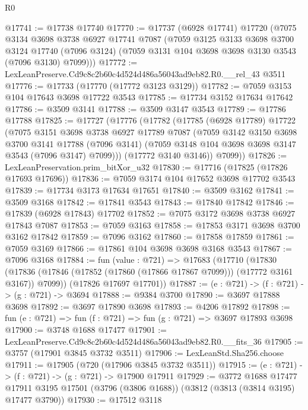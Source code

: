 \begin{lexlean}{R0}
\begin{coremodule}
@17741 := @17738 @17740
@17770 := @17737
    (@6928 @17741)
    @17720
    (@7075
      @3134
      @3698
      @3738
      @6927
      @17741
      @7087
      (@7059
        @3125
        @3133
        @3698
        @3700
        @3124
        @17740
        (@7096 @3124)
        (@7059 @3131 @104 @3698 @3698 @3130 @3543 (@7096 @3130) @7099)))
@17772 := LexLeanPreserve.Cd9c8c2b60c4d524d486a56043ad9eb82.R0.__rel_43 @3511
@17776 := @17733 (@17770 (@17772 @3123 @3129))
@17782 := @7059 @3153 @104 @17643 @3698 @17722 @3543
@17785 := @17734 @3152 @17634 @17642
@17786 := @3509 @3141
@17788 := @3509 @3147 @3543
@17789 := @17786 @17788
@17825 := @17727
    (@17776
      (@17782
        (@17785
          (@6928 @17789)
          @17722
          (@7075
            @3151
            @3698
            @3738
            @6927
            @17789
            @7087
            (@7059
              @3142
              @3150
              @3698
              @3700
              @3141
              @17788
              (@7096 @3141)
              (@7059 @3148 @104 @3698 @3698 @3147 @3543 (@7096 @3147) @7099)))
          (@17772 @3140 @3146))
        @7099))
@17826 := LexLeanPreservation.prim_bitXor_u32
@17830 := @17716 (@17825 (@17826 @17693 @17696))
@17836 := @7059 @3174 @104 @17652 @3698 @17702 @3543
@17839 := @17734 @3173 @17634 @17651
@17840 := @3509 @3162
@17841 := @3509 @3168
@17842 := @17841 @3543
@17843 := @17840 @17842
@17846 := @17839 (@6928 @17843) @17702
@17852 := @7075 @3172 @3698 @3738 @6927 @17843 @7087
@17853 := @7059 @3163
@17858 := @17853 @3171 @3698 @3700 @3162 @17842
@17859 := @7096 @3162
@17860 := @17858 @17859
@17861 := @7059 @3169
@17866 := @17861 @104 @3698 @3698 @3168 @3543
@17867 := @7096 @3168
@17884 := fun (value : @721) =>
  @17683
    (@17710
      (@17830 (@17836 (@17846 (@17852 (@17860 (@17866 @17867 @7099))) (@17772 @3161 @3167)) @7099))
      (@17826 @17697 @17701))
@17887 := (e : @721) -> (f : @721) -> (g : @721) -> @3694
@17888 := @9384 @3700
@17890 := @3697 @17888 @3698
@17892 := @3697 @17890 @3698
@17893 := @4206 @17892
@17898 := fun (e : @721) => fun (f : @721) => fun (g : @721) => @3697 @17893 @3698
@17900 := @3748 @1688 @17477
@17901 := LexLeanPreserve.Cd9c8c2b60c4d524d486a56043ad9eb82.R0.__fits_36
@17905 := @3757 (@17901 @3845 @3732 @3511)
@17906 := LexLeanStd.Sha256.choose
@17911 := @17905 (@720 (@17906 @3845 @3732 @3511))
@17915 := (e : @721) -> (f : @721) -> (g : @721) -> @17900 @17911
@17929 := @3772
    @1688
    @17477
    @17911
    @3195
    @17501
    (@3796 (@3806 @1688))
    (@3812 (@3813 (@3814 @3195) @17477 @3790))
@17930 := @17512 @3118

\end{coremodule}
\end{lexlean}

